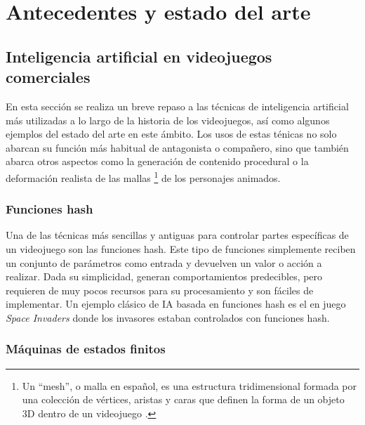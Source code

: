 \chapter{Antecedentes y estado del arte} \label{chap:antecedentes}

\section{Inteligencia artificial en videojuegos comerciales} \label{sec:ia_videojuegos}

En esta sección se realiza un breve repaso a las técnicas de inteligencia artificial más utilizadas a lo largo de la historia de los videojuegos, así como algunos ejemplos del estado del arte en este ámbito. Los usos de estas ténicas no solo abarcan su función más habitual de antagonista o compañero, sino que también abarca otros aspectos como la generación de contenido procedural o la deformación realista de las mallas \footnote{Un ``mesh'', o malla en español, es una estructura tridimensional formada por una colección de vértices, aristas y caras que definen la forma de un objeto 3D dentro de un videojuego \cite{universidad_europea_que_2025}.} de los personajes animados.

\subsection{Funciones hash}

Una de las técnicas más sencillas y antiguas para controlar partes específicas de un videojuego son las funciones hash. Este tipo de funciones simplemente reciben un conjunto de parámetros como entrada y devuelven un valor o acción a realizar. Dada su simplicidad, generan comportamientos predecibles, pero requieren de muy pocos recursos para su procesamiento y son fáciles de implementar. Un ejemplo clásico de IA basada en funciones hash es el en juego \textit{Space Invaders} \cite{wikipedia_artificial_2025} donde los invasores estaban controlados con funciones hash. 

\subsection{Máquinas de estados finitos}

